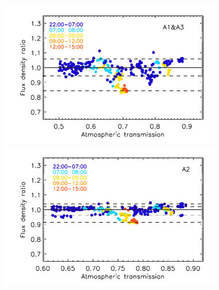 %
\begin{figure}[!thbp]
  \begin{center}
      \includegraphics[clip=true, trim={0.9cm, 0, 0.5cm, 0.6cm},width=0.75\linewidth]{Figures/plot_flux_density_ratio_obstau_allbright_obsdate_corrected_skydip_rescaled_1mm.pdf}
     \includegraphics[clip=true, trim={0.9cm, 0, 0.5cm, 0.6cm},width=0.75\linewidth]{Figures/plot_flux_density_ratio_obstau_allbright_obsdate_corrected_skydip_rescaled_a2.pdf} 



\end{center}
\end{figure}
